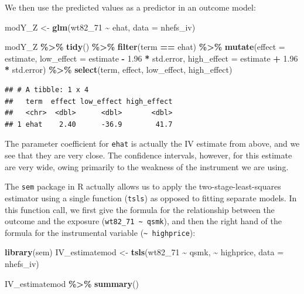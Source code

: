 \documentclass[
]{book}
\newenvironment{Shaded}{\begin{snugshade}}{\end{snugshade}}
\newcommand{\AttributeTok}[1]{\textcolor[rgb]{0.13,0.29,0.53}{#1}}
\newcommand{\FloatTok}[1]{\textcolor[rgb]{0.00,0.00,0.81}{#1}}
\newcommand{\FunctionTok}[1]{\textcolor[rgb]{0.13,0.29,0.53}{\textbf{#1}}}
\newcommand{\NormalTok}[1]{#1}
\newcommand{\OtherTok}[1]{\textcolor[rgb]{0.56,0.35,0.01}{#1}}
\newcommand{\SpecialCharTok}[1]{\textcolor[rgb]{0.81,0.36,0.00}{\textbf{#1}}}
\newcommand{\StringTok}[1]{\textcolor[rgb]{0.31,0.60,0.02}{#1}}
\begin{document}
We then use the predicted values as a predictor in an outcome model:

\begin{Shaded}
\begin{Highlighting}[]
\NormalTok{modY\_Z }\OtherTok{\textless{}{-}} \FunctionTok{glm}\NormalTok{(wt82\_71 }\SpecialCharTok{\textasciitilde{}}\NormalTok{ ehat, }\AttributeTok{data =}\NormalTok{ nhefs\_iv)}


\NormalTok{modY\_Z }\SpecialCharTok{\%\textgreater{}\%}
  \FunctionTok{tidy}\NormalTok{() }\SpecialCharTok{\%\textgreater{}\%} 
  \FunctionTok{filter}\NormalTok{(term }\SpecialCharTok{==} \StringTok{\textquotesingle{}ehat\textquotesingle{}}\NormalTok{) }\SpecialCharTok{\%\textgreater{}\%}
  \FunctionTok{mutate}\NormalTok{(}\AttributeTok{effect =}\NormalTok{ estimate,}
         \AttributeTok{low\_effect =}\NormalTok{ estimate }\SpecialCharTok{{-}} \FloatTok{1.96} \SpecialCharTok{*}\NormalTok{ std.error, }
         \AttributeTok{high\_effect =}\NormalTok{ estimate }\SpecialCharTok{+} \FloatTok{1.96} \SpecialCharTok{*}\NormalTok{ std.error) }\SpecialCharTok{\%\textgreater{}\%} 
  \FunctionTok{select}\NormalTok{(term, effect, low\_effect, high\_effect)}
\end{Highlighting}
\end{Shaded}

\begin{verbatim}
## # A tibble: 1 x 4
##   term  effect low_effect high_effect
##   <chr>  <dbl>      <dbl>       <dbl>
## 1 ehat    2.40      -36.9        41.7
\end{verbatim}

The parameter coefficient for \texttt{ehat} is actually the IV estimate from above, and we see that they are very close. The confidence intervals, however, for this estimate are very wide, owing primarily to the weakness of the instrument we are using.

The \texttt{sem} package in R actually allows us to apply the two-stage-least-squares estimator using a single function (\texttt{tsls}) as opposed to fitting separate models.
In this function call, we first give the formula for the relationship between
the outcome and the exposure (\texttt{wt82\_71\ \textasciitilde{}\ qsmk}), and then the right hand of the formula for
the instrumental variable (\texttt{\textasciitilde{}\ highprice}):

\begin{Shaded}
\begin{Highlighting}[]
\FunctionTok{library}\NormalTok{(sem)}
\NormalTok{IV\_estimatemod }\OtherTok{\textless{}{-}} \FunctionTok{tsls}\NormalTok{(wt82\_71 }\SpecialCharTok{\textasciitilde{}}\NormalTok{ qsmk, }\SpecialCharTok{\textasciitilde{}}\NormalTok{ highprice, }\AttributeTok{data =}\NormalTok{ nhefs\_iv)}

\NormalTok{IV\_estimatemod }\SpecialCharTok{\%\textgreater{}\%}
  \FunctionTok{summary}\NormalTok{()}
\end{Highlighting}
\end{Shaded}
\end{document}
